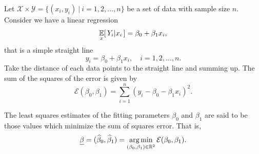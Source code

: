 Let $\mathcal{X} \times \mathcal{Y} = \{ (x_i, y_i) \> | \> i = 1,2 , \ldots, n \}$ be a set of data with sample size $n$. Consider 
we have a linear regression
\begin{equation}
    \uexp[x]{Y_i | x_i} = \beta_0 + \beta_1 x_i,
\end{equation}
that is a simple straight line 
\begin{equation}
    y_i = \beta_0 + \beta_1 x_i, \quad i = 1,2,\ldots,n.
\end{equation}
Take the distance of each data points to the straight line and summing up. The sum of the squares of the 
error is given by
\begin{equation}
    \mathcal{E} (\beta_0, \beta_1) = \sum_{i=1}^{n} (y_i - \beta_0 - \beta_1 x_i)^2.
\end{equation}

The least squares estimates of the fitting parameters $\beta_0$ and $\beta_1$ are said to be those values 
which minimize the sum of squares error. That is,
\begin{equation}
    \underline{\beta} = (\widehat{\beta}_0, \widehat{\beta}_1) = \operatorname*{arg\,min}_{(\beta_0, \beta_1) \in \mathbb{R}^2} \mathcal{E} (\beta_0, \beta_1).
\end{equation}

